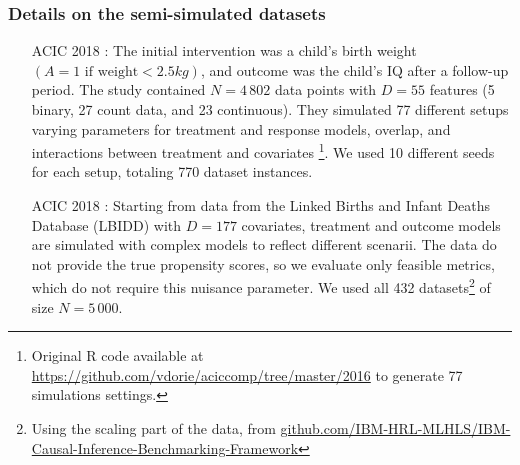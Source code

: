 \documentclass[a4paper,num-refs]{oup-contemporary}%
\begin{document}
\subsubsection{ Details on the semi-simulated datasets}\label{apd:experiments:datasets}


\begin{itemize}
    \item[ACIC 2018] \cite{dorie_automated_2019}:  The initial intervention was a child’s birth
        weight $(A = 1 \text{ if weight} < 2.5 kg)$, and outcome was the child’s
        IQ after a follow-up period. The study contained $N=4\,802$ data
        points with $D=55$ features (5 binary, 27 count data, and 23
        continuous). They simulated 77 different setups varying parameters
        for treatment and response models, overlap, and interactions between treatment and
        covariates \footnote{Original R code available at
            \url{https://github.com/vdorie/aciccomp/tree/master/2016}
            to generate 77 simulations settings.}. We used 10 different seeds
        for each setup, totaling 770 dataset instances.

    \item[ACIC 2018] \cite{shimoni_benchmarking_2018}: Starting from data from
        the Linked Births and Infant Deaths Database (LBIDD)
        \cite{macdorman_infant_1998} with $D=177$ covariates, treatment and
        outcome models are simulated with complex models to reflect different
        scenarii. The data do not provide the true propensity scores, so we
        evaluate only feasible metrics, which do not require this nuisance
        parameter. We used all 432 datasets\footnote{Using the scaling part of
            the data, from
            \href{https://github.com/IBM-HRL-MLHLS/IBM-Causal-Inference-Benchmarking-Framework}{github.com/IBM-HRL-MLHLS/IBM-Causal-Inference-Benchmarking-Framework}}
        of size $N=5\,000$.



\end{itemize}
\end{document}
